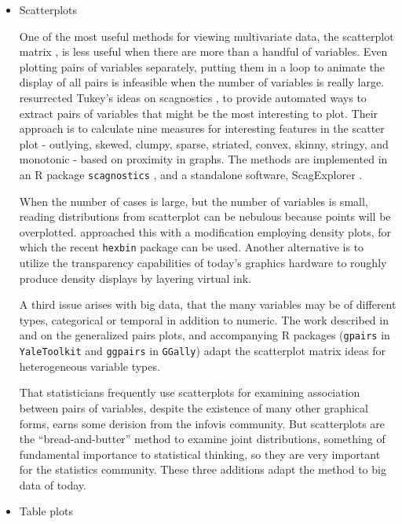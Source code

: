 \documentclass{article}
\begin{document}
\begin{itemize}
\item Scatterplots

One of the most useful methods for viewing multivariate data, the scatterplot matrix \citep{scatmat}, is less useful when there are more than a handful of variables. Even plotting pairs of variables separately, putting them in a loop to animate the display of all pairs is infeasible when the number of variables is really large.  \citet{wilkinson2005graph} resurrected Tukey's ideas on scagnostics \citep{TukeyTukey1985}, to provide automated ways to extract pairs of variables that might be the most interesting to plot. Their approach is to calculate nine measures for interesting features in the scatter plot - outlying, skewed, clumpy, sparse, striated, convex, skinny, stringy, and monotonic - based on proximity in graphs. The methods are implemented in an R package {\tt scagnostics} \citep{wilkinson2014package}, and a standalone software, ScagExplorer \citep{dang2014scagexplorer}.

When the number of cases is large, but the number of variables is small, reading distributions from scatterplot can be nebulous because points will be overplotted. \citet{carr-scatmat} approached this with a modification employing density plots, for which the recent {\tt hexbin} \citep{carr2010hexbin} package can be used. Another alternative is to utilize the transparency capabilities of today's graphics hardware to roughly produce density displays by layering virtual ink.

A third issue arises with big data, that the many variables may be of different types, categorical or temporal in addition to numeric. The work described in \citet{emerson2013generalized} and \citet{friendly2014comment} on the generalized pairs plots, and accompanying R packages ({\tt gpairs} in {\tt YaleToolkit} and {\tt ggpairs} in {\tt GGally}) adapt the scatterplot matrix ideas for heterogeneous variable types.

That statisticians frequently use scatterplots for examining association between pairs of variables, despite the existence of many other graphical forms, earns some derision from the infovis community. But scatterplots are the ``bread-and-butter'' method to examine joint distributions, something of fundamental importance to statistical thinking, so they are very important for the statistics community. These three additions adapt the method to big data of today.

\item Table plots


\end{itemize}
\end{document}
